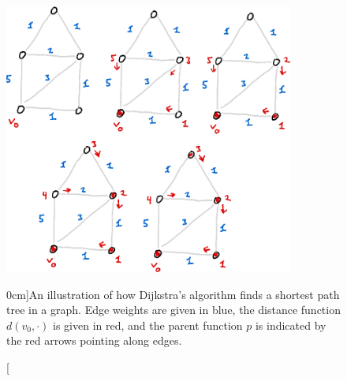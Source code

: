 \documentclass[nobib]{tufte-handout}
\begin{document}
\begin{figure}
  \centering
  \includegraphics[width=0.85\textwidth]{graphics/L6_prim_kruskal_dijkstra/dijkstras_algorithm.png}
  \caption[][0cm]{An illustration of how Dijkstra's algorithm finds a shortest path tree in a graph. Edge weights are given in blue, the distance function $d(v_0, \cdot)$ is given in red, and the parent function $p$ is indicated by the red arrows pointing along edges.}
  \label{fig:dijkstras_algorithm}
\end{figure}
\end{document}
